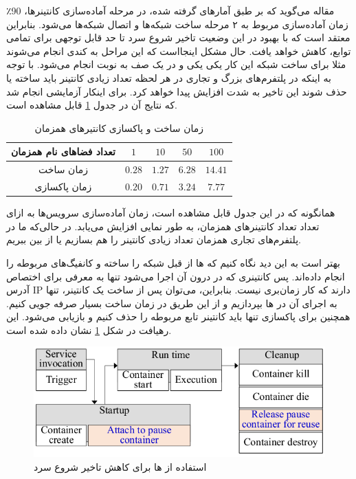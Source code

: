مقاله می‌گوید که بر طبق آمارهای گرفته شده، در مرحله آماده‌سازی کانتینرها، 90٪ زمان آماده‌سازی مربوط به ۲ مرحله ساخت شبکه‌ها و اتصال شبکه‌ها می‌شود. بنابراین معتقد است که با بهبود در این وضعیت تاخیر شروع سرد تا حد قابل توجهی برای تمامی توابع، کاهش خواهد یافت. حال مشکل اینجا‌است که این مراحل به کندی انجام می‌شوند مثلا برای ساخت شبکه این کار یکی یکی و در یک صف به نوبت انجام می‌شود. با توجه به اینکه در پلتفرم‌های بزرگ و تجاری در هر لحظه تعداد زیادی کانتینر باید ساخته یا حذف شوند این تاخیر به شدت افزایش پیدا خواهد کرد. برای اینکار آزمایشی انجام شد که نتایج آن در جدول \ref{table:1} قابل مشاهده است. 
\par

\begin{table}[h]
	\begin{center}
		\caption{زمان ساخت و پاکسازی کانتیرهای همزمان}
		\begin{tabular} {| c | c | c | c | c |}
			\hline
			
			تعداد فضا‌های نام همزمان & $1$ & $10$ & $50$ & $100$ \\
			\hline
			زمان ساخت & $0.28$ & $1.27$ & $6.28$ & $14.41$ \\
			\hline
			زمان پاکسازی & $0.20$ & $0.71$ & $3.24$ & $7.77$ \\
			\hline
		\end{tabular}
	\label{table:1}
	\end{center}
\end{table}

همانگونه که در این جدول قابل مشاهده است، زمان آماده‌سازی سرویس‌ها به ازای تعداد تعداد کانتینرهای همزمان، به طور نمایی افزایش می‌یابد. در حالی‌که ما در پلتفرم‌های تجاری همزمان تعداد زیادی کانتینر را هم بسازیم یا از بین ببریم. 

بهتر است به این دید نگاه کنیم که  ها از قبل شبکه را ساخته و کانفیگ‌های مربوطه را انجام داده‌اند. پس کانتینری که در درون آن اجرا می‌شود تنها به معرفی برای اختصاص آدرس IP دارند که کار زمان‌بری نیست. بنابراین، می‌توان پس از ساخت یک کانتینر، تنها به اجرای آن در  ها بپردازیم و از این طریق در زمان ساخت بسیار صرفه جویی کنیم. همچنین برای پاکسازی تنها باید کانتینر تابع مربوطه را حذف کنیم و  بازیابی می‌شود. این رهیافت در شکل \ref{fig:pause-container-solution} نشان داده شده است.

\begin{figure}
	\centering
	\includegraphics[width=\linewidth]{figs/pause-container-solution}
	\caption {استفاده از ها برای کاهش تاخیر شروع سرد}
	\label{fig:pause-container-solution}
\end{figure}

